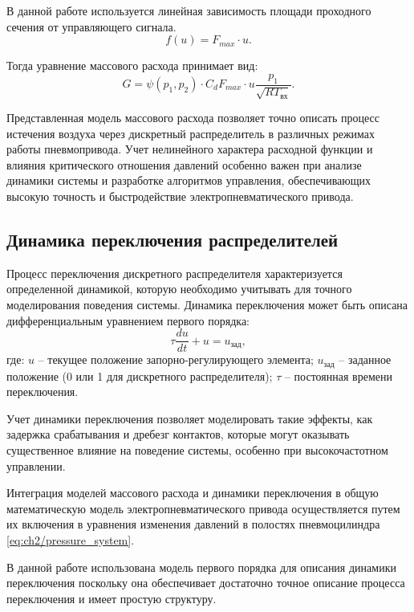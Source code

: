 В данной работе используется линейная зависимость площади проходного сечения от управляющего сигнала.
\begin{equation*}
    f(u) = F_{max} \cdot u.
\end{equation*}

Тогда уравнение массового расхода принимает вид:
\begin{equation}\label{eq:ch2/mass_flow}
    G = \psi(p_1, p_2) \cdot C_d F_{max} \cdot u \frac{p_1}{\sqrt{RT_\text{вх}}}.
\end{equation}

Представленная модель массового расхода позволяет точно описать процесс истечения
воздуха через дискретный распределитель в различных режимах работы
пневмопривода. Учет нелинейного характера расходной функции и
влияния критического отношения давлений особенно важен при анализе динамики
системы и разработке алгоритмов управления, обеспечивающих высокую точность
и быстродействие электропневматического привода.

\subsection{Динамика переключения распределителей}\label{sec:ch2/sec3/subsec2}

Процесс переключения дискретного распределителя характеризуется
определенной динамикой, которую необходимо учитывать для точного моделирования поведения
системы. Динамика переключения может быть описана дифференциальным уравнением первого порядка:
\begin{equation}\label{eq:ch2/switching_dynamics}
    \tau \frac{du}{dt} + u = u_{зад},
\end{equation}
где:
$u$ -- текущее положение запорно-регулирующего элемента;
$u_{зад}$ -- заданное положение (0 или 1 для дискретного распределителя);
$\tau$ -- постоянная времени переключения.

Учет динамики переключения позволяет моделировать такие эффекты, как задержка
срабатывания и дребезг контактов, которые могут оказывать
существенное влияние на поведение системы,
особенно при высокочастотном управлении.

Интеграция моделей массового расхода и динамики переключения
в общую математическую модель электропневматического привода
осуществляется путем их включения в уравнения
изменения давлений в полостях пневмоцилиндра \ref{eq:ch2/pressure_system}.

В данной работе использована модель первого порядка для описания динамики переключения
поскольку она обеспечивает достаточно точное описание процесса переключения
и имеет простую структуру.


